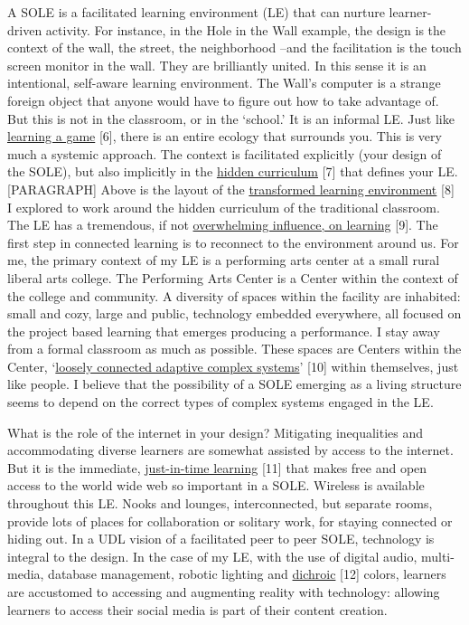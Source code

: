 A SOLE is a facilitated learning environment (LE) that can nurture
learner-driven activity. For instance, in the Hole in the Wall example,
the design is the context of the wall, the street, the neighborhood
--and the facilitation is the touch screen monitor in the wall. They are
brilliantly united. In this sense it is an intentional, self-aware
learning environment. The Wall's computer is a strange foreign object
that anyone would have to figure out how to take advantage of. But this
is not in the classroom, or in the `school.' It is an informal LE. Just
like
\href{http://www.academia.edu/1137269/Game-based_Learning_and_Intrinsic_Motivation}{learning
a game} {{[}6{]}}, there is an entire ecology that surrounds you. This
is very much a systemic approach. The context is facilitated explicitly
(your design of the SOLE), but also implicitly in the
\href{http://en.wikipedia.org/wiki/Hidden_curriculum}{hidden curriculum}
{{[}7{]}} that defines your LE. {[}PARAGRAPH{]} Above is the layout of
the
\href{http://www.scribd.com/doc/181089012/Transformed-Learning-Environment-Analysis}{transformed
learning environment} {{[}8{]}} I explored to work around the hidden
curriculum of the traditional classroom. The LE has a tremendous, if not
\href{http://scholar.lib.vt.edu/theses/available/etd-09232007-220306/unrestricted/SElmasryETDbodytext.pdf}{overwhelming
influence, on learning} {{[}9{]}}. The first step in connected learning
is to reconnect to the environment around us. For me, the primary
context of my LE is a performing arts center at a small rural liberal
arts college. The Performing Arts Center is a Center within the context
of the college and community. A diversity of spaces within the facility
are inhabited: small and cozy, large and public, technology embedded
everywhere, all focused on the project based learning that emerges
producing a performance. I stay away from a formal classroom as much as
possible. These spaces are Centers within the Center,
`\href{http://nourdiab.wordpress.com/2011/02/23/the-theories-of-christopher-alexander/}{loosely
connected adaptive complex systems}' {{[}10{]}} within themselves, just
like people. I believe that the possibility of a SOLE emerging as a
living structure seems to depend on the correct types of complex systems
engaged in the LE.

What is the role of the internet in your design? Mitigating inequalities
and accommodating diverse learners are somewhat assisted by access to
the internet. But it is the immediate,
\href{http://www.wordstream.com/blog/ws/2013/10/02/just-in-time-information-hacks}{just-in-time
learning} {{[}11{]}} that makes free and open access to the world wide
web so important in a SOLE. Wireless is available throughout this LE.
Nooks and lounges, interconnected, but separate rooms, provide lots of
places for collaboration or solitary work, for staying connected or
hiding out. In a UDL vision of a facilitated peer to peer SOLE,
technology is integral to the design. In the case of my LE, with the use
of digital audio, multi-media, database management, robotic lighting and
\href{http://en.wikipedia.org/wiki/Dichroic_filter}{dichroic} {{[}12{]}}
colors, learners are accustomed to accessing and augmenting reality with
technology: allowing learners to access their social media is part of
their content creation.

